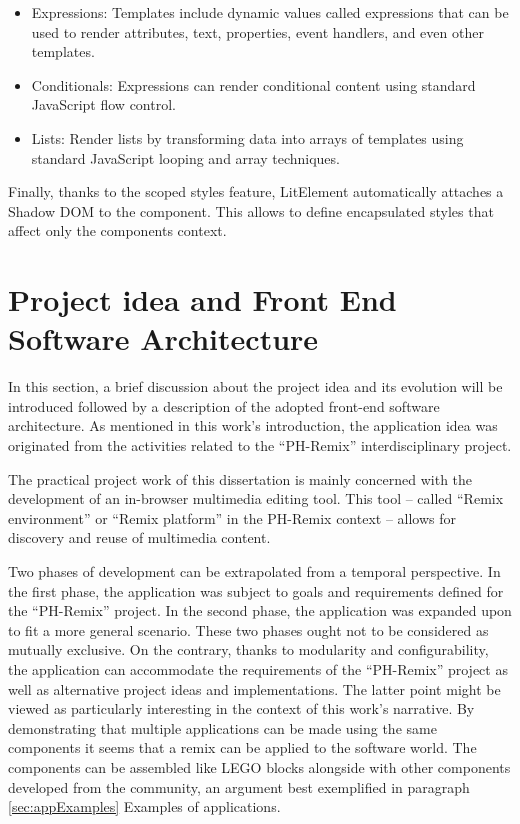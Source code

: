 \begin{itemize}
\item Expressions: Templates include dynamic values called expressions that can be used to render attributes, text, properties, event handlers, and even other templates.
\item Conditionals: Expressions can render conditional content using standard JavaScript flow control.
\item Lists: Render lists by transforming data into arrays of templates using standard JavaScript looping and array techniques.
\end{itemize}

Finally, thanks to the scoped styles feature, LitElement automatically attaches a Shadow DOM to the component. This allows to define encapsulated styles that affect only the components context.

\section{Project idea and Front End Software Architecture}
\label{sec:SoftwareArchitecture}

In this section, a brief discussion about the project idea and its evolution will be introduced followed by a description of the adopted front-end software architecture. As mentioned in this work’s introduction, the application idea was originated from the activities related to the “PH-Remix” interdisciplinary project.

The practical project work of this dissertation is mainly concerned with the development of an in-browser multimedia editing tool. This tool – called “Remix environment” or “Remix platform” in the PH-Remix context – allows for discovery and reuse of multimedia content.

Two phases of development can be extrapolated from a temporal perspective. In the first phase, the application was subject to goals and requirements defined for the “PH-Remix” project. In the second phase, the application was expanded upon to fit a more general scenario. These two phases ought not to be considered as mutually exclusive. On the contrary, thanks to modularity and configurability, the application can accommodate the requirements of the “PH-Remix” project as well as alternative project ideas and implementations. The latter point might be viewed as particularly interesting in the context of this work’s narrative. By demonstrating that multiple applications can be made using the same components it seems that a remix can be applied to the software world. The components can be assembled like LEGO blocks alongside with other components developed from the community, an argument best exemplified in paragraph \ref{sec:appExamples} Examples of applications.

